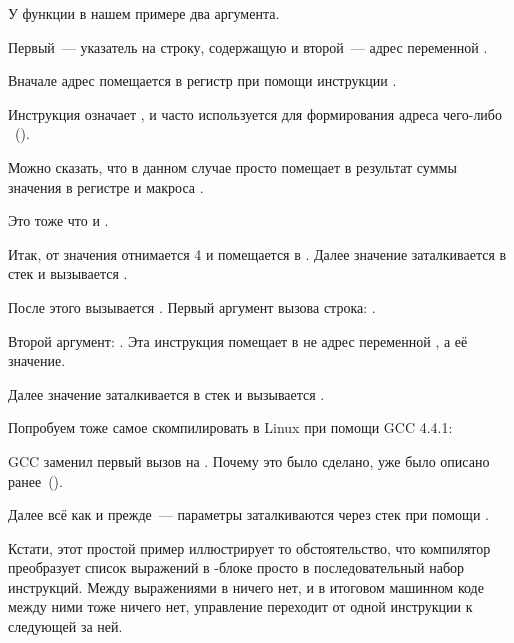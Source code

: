 У функции \scanf в нашем примере два аргумента.

Первый~--- указатель на строку, содержащую  и второй~--- адрес переменной .

Вначале адрес  помещается в регистр \EAX при помощи инструкции .

Инструкция \LEA означает , и часто используется для формирования адреса чего-либо ~().

Можно сказать, что в данном случае \LEA просто помещает в \EAX результат суммы значения в регистре \EBP и макроса .

Это тоже что и .

Итак, от значения \EBP отнимается 4 и помещается в \EAX.
Далее значение \EAX заталкивается в стек и вызывается \scanf.

После этого вызывается \printf. Первый аргумент вызова строка:
.

Второй аргумент: .
Эта инструкция помещает в \ECX не адрес переменной , а её значение.

Далее значение \ECX заталкивается в стек и вызывается \printf.




Попробуем тоже самое скомпилировать в Linux при помощи GCC 4.4.1:



GCC заменил первый вызов \printf на \puts. Почему это было сделано, 
уже было описано ранее~().

% 


Далее всё как и прежде~--- параметры заталкиваются через стек при помощи \MOV.


Кстати, этот простой пример иллюстрирует то обстоятельство, что компилятор преобразует
список выражений в \CCpp-блоке просто в последовательный набор инструкций.
Между выражениями в \CCpp ничего нет, и в итоговом машинном коде между ними тоже ничего нет, 
управление переходит от одной инструкции к следующей за ней.


